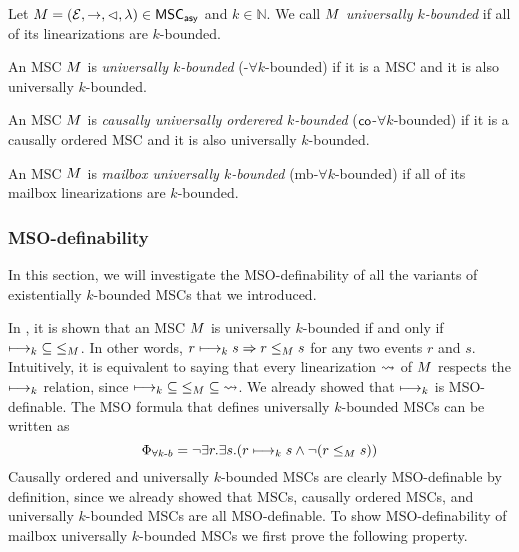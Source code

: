 \documentclass{article}
\begin{document}
\begin{definition}\label{def:uk_bounded_msc}
	Let $M = (\mathcal{E}, \rightarrow, \lhd, \lambda) \in \mathsf{MSC}_{\mathsf{asy}}$ and $k \in \mathbb{N}$. We call $M$ \emph{universally $k$-bounded} if all of its linearizations are $k$-bounded.
\end{definition}
\begin{definition}
	An MSC $M$ is \emph{\pp universally $k$-bounded} (\pp-$\forall k$-bounded) if it is a \pp MSC and it is also universally $k$-bounded.
\end{definition}
\begin{definition}
	An MSC $M$ is \emph{causally universally orderered $k$-bounded} ($\mathsf{co}$-$\forall k$-bounded) if it is a causally ordered MSC and it is also universally $k$-bounded.
\end{definition}
\begin{definition}
	An MSC $M$ is \emph{mailbox universally $k$-bounded} (mb-$\forall k$-bounded) if all of its mailbox linearizations are $k$-bounded.
\end{definition}

\subsubsection{MSO-definability}

In this section, we will investigate the MSO-definability of all the variants of existentially $k$-bounded MSCs that we introduced.

In \cite{DBLP:conf/fossacs/LohreyM02}, it is shown that an MSC $M$ is universally $k$-bounded if and only if $\longmapsto_k \;\subseteq\; \le_M$. In other words, $r \longmapsto_k s \Rightarrow r \le_M s$ for any two events $r$ and $s$. Intuitively, it is equivalent to saying that every linearization $\rightsquigarrow$ of $M$ respects the $\longmapsto_k$ relation, since $\longmapsto_k \;\subseteq\; \le_M \;\subseteq\; \rightsquigarrow$. We already showed that $\longmapsto_k$ is MSO-definable. The MSO formula that defines universally $k$-bounded  MSCs can be written as
\[ \Phi_{\forall k\text{-}b} = \neg \exists r.\exists s.(r \longmapsto_k s \wedge \neg(r \le_M s)) \]
Causally ordered and \pp universally $k$-bounded MSCs are clearly MSO-definable by definition, since we already showed that \pp MSCs, causally ordered MSCs, and universally $k$-bounded MSCs are all MSO-definable. To show MSO-definability of mailbox universally $k$-bounded MSCs we first prove the following property.
\end{document}
